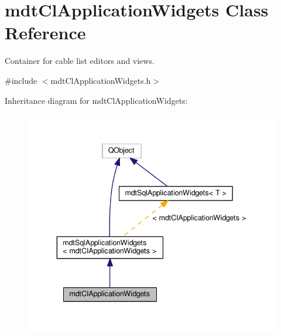 \hypertarget{classmdt_cl_application_widgets}{\section{mdt\-Cl\-Application\-Widgets Class Reference}
\label{classmdt_cl_application_widgets}
}


Container for cable list editors and views.  




{\ttfamily \#include $<$mdt\-Cl\-Application\-Widgets.\-h$>$}



Inheritance diagram for mdt\-Cl\-Application\-Widgets\-:\nopagebreak
\begin{figure}[H]
\begin{center}
\leavevmode
\includegraphics[width=339pt]{classmdt_cl_application_widgets__inherit__graph}
\end{center}
\end{figure}


